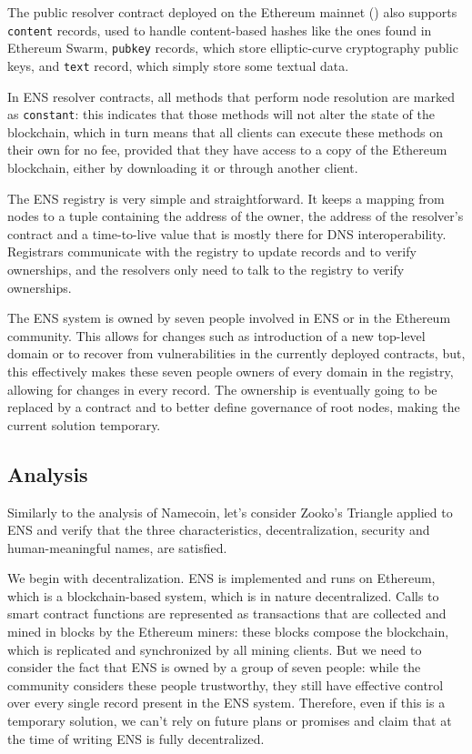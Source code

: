 \documentclass[mscthesis]{usiinfthesis}
\begin{document}
The public resolver contract deployed on the Ethereum mainnet (\cite{enspublicresolver}) also supports \texttt{content} records, used to handle content-based hashes like the ones found in Ethereum Swarm, \texttt{pubkey} records, which store elliptic-curve cryptography public keys, and \texttt{text} record, which simply store some textual data.

In ENS resolver contracts, all methods that perform node resolution are marked as \texttt{constant}: this indicates that those methods will not alter the state of the blockchain, which in turn means that all clients can execute these methods on their own for no fee, provided that they have access to a copy of the Ethereum blockchain, either by downloading it or through another client.

The ENS registry is very simple and straightforward. It keeps a mapping from nodes to a tuple containing the address of the owner, the address of the resolver's contract and a time-to-live value that is mostly there for DNS interoperability. Registrars communicate with the registry to update records and to verify ownerships, and the resolvers only need to talk to the registry to verify ownerships.

The ENS system is owned by seven people involved in ENS or in the Ethereum community. This allows for changes such as introduction of a new top-level domain or to recover from vulnerabilities in the currently deployed contracts, but, this effectively makes these seven people owners of every domain in the registry, allowing for changes in every record. The ownership is eventually going to be replaced by a contract and to better define governance of root nodes, making the current solution temporary.

\subsection{Analysis}

Similarly to the analysis of Namecoin, let's consider Zooko's Triangle applied to ENS and verify that the three characteristics, decentralization, security and human-meaningful names, are satisfied.

We begin with decentralization. ENS is implemented and runs on Ethereum, which is a blockchain-based system, which is in nature decentralized. Calls to smart contract functions are represented as transactions that are collected and mined in blocks by the Ethereum miners: these blocks compose the blockchain, which is replicated and synchronized by all mining clients. But we need to consider the fact that ENS is owned by a group of seven people: while the community considers these people trustworthy, they still have effective control over every single record present in the ENS system. Therefore, even if this is a temporary solution, we can't rely on future plans or promises and claim that at the time of writing ENS is fully decentralized.
\end{document}
